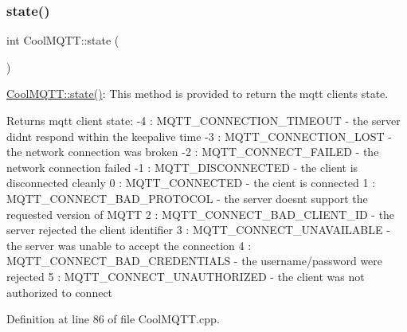 \subsubsection{\texorpdfstring{state()}{state()}}
{\footnotesize\ttfamily int Cool\+M\+Q\+T\+T\+::state (\begin{DoxyParamCaption}{ }\end{DoxyParamCaption})}

\hyperlink{class_cool_m_q_t_t_a5d003307eff78efbd585e42b43b72b6d}{Cool\+M\+Q\+T\+T\+::state()}\+: This method is provided to return the mqtt client\textquotesingle{}s state. \begin{DoxyReturn}{Returns}
mqtt client state\+: -\/4 \+: M\+Q\+T\+T\+\_\+\+C\+O\+N\+N\+E\+C\+T\+I\+O\+N\+\_\+\+T\+I\+M\+E\+O\+UT -\/ the server didn\textquotesingle{}t respond within the keepalive time -\/3 \+: M\+Q\+T\+T\+\_\+\+C\+O\+N\+N\+E\+C\+T\+I\+O\+N\+\_\+\+L\+O\+ST -\/ the network connection was broken -\/2 \+: M\+Q\+T\+T\+\_\+\+C\+O\+N\+N\+E\+C\+T\+\_\+\+F\+A\+I\+L\+ED -\/ the network connection failed -\/1 \+: M\+Q\+T\+T\+\_\+\+D\+I\+S\+C\+O\+N\+N\+E\+C\+T\+ED -\/ the client is disconnected cleanly 0 \+: M\+Q\+T\+T\+\_\+\+C\+O\+N\+N\+E\+C\+T\+ED -\/ the cient is connected 1 \+: M\+Q\+T\+T\+\_\+\+C\+O\+N\+N\+E\+C\+T\+\_\+\+B\+A\+D\+\_\+\+P\+R\+O\+T\+O\+C\+OL -\/ the server doesn\textquotesingle{}t support the requested version of M\+Q\+TT 2 \+: M\+Q\+T\+T\+\_\+\+C\+O\+N\+N\+E\+C\+T\+\_\+\+B\+A\+D\+\_\+\+C\+L\+I\+E\+N\+T\+\_\+\+ID -\/ the server rejected the client identifier 3 \+: M\+Q\+T\+T\+\_\+\+C\+O\+N\+N\+E\+C\+T\+\_\+\+U\+N\+A\+V\+A\+I\+L\+A\+B\+LE -\/ the server was unable to accept the connection 4 \+: M\+Q\+T\+T\+\_\+\+C\+O\+N\+N\+E\+C\+T\+\_\+\+B\+A\+D\+\_\+\+C\+R\+E\+D\+E\+N\+T\+I\+A\+LS -\/ the username/password were rejected 5 \+: M\+Q\+T\+T\+\_\+\+C\+O\+N\+N\+E\+C\+T\+\_\+\+U\+N\+A\+U\+T\+H\+O\+R\+I\+Z\+ED -\/ the client was not authorized to connect 
\end{DoxyReturn}


Definition at line 86 of file Cool\+M\+Q\+T\+T.\+cpp.


